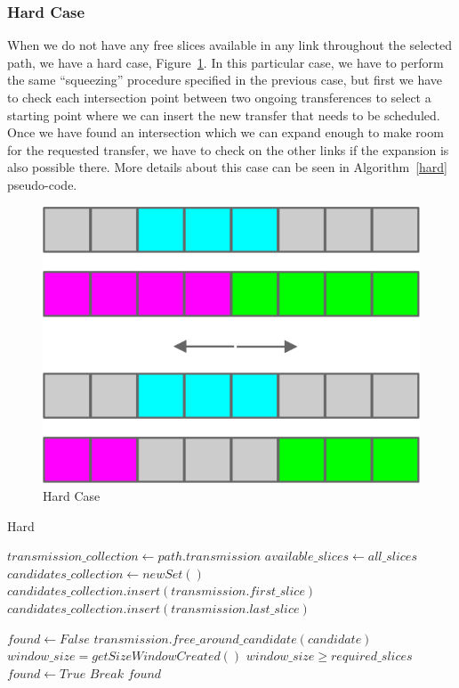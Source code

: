 \documentclass[11pt,a4paper]{article}
\begin{document}
\subsubsection{Hard Case}

When we do not have any free slices available in any link throughout the selected path, we have a hard case, Figure~\ref{fig:hardcase}. In this particular case, we have to perform the same ``squeezing'' procedure specified in the previous case, but first we have to check each intersection point between two ongoing transferences to select a starting point where we can insert the new transfer that needs to be scheduled. Once we have found an intersection which we can expand enough to make room for the requested transfer, we have to check on the other links if the expansion is also possible there. More details about this case can be seen in Algorithm~\ref{hard} pseudo-code.\\

\begin{figure}[H]
  \centering
    \includegraphics[scale=1]{hardcase.jpg}
  \caption{Hard Case}
  \label{fig:hardcase}
\end{figure}

\begin{algorithm}[H]
\caption{Hard}\label{hard}
\begin{algorithmic}[1]
	\State $transmission\_collection\gets path.transmission$
	\State $available\_slices\gets all\_slices$
	\State $candidates\_collection\gets new Set()$
      \State $candidates\_collection.insert(transmission.first\_slice)$
      \State $candidates\_collection.insert(transmission.last\_slice)$
	\EndFor
	
	\State $found \gets False$
			\State $transmission.free\_around\_candidate(candidate)$
		\EndFor
		\State $window\_size=getSizeWindowCreated()$
		\If $window\_size \geq required\_slices$
			\State $found \gets True$
			\State $Break$
		\EndIf
	\EndFor
	\State \Return $found$
\EndProcedure
\end{algorithmic}
\end{algorithm}
\end{document}

